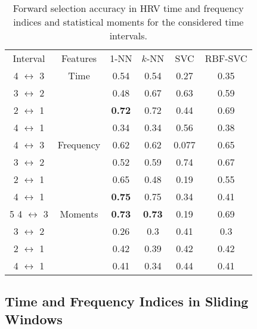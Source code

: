\begin{table}[t]
\caption{Forward selection accuracy in HRV time and frequency indices and statistical moments for the considered time intervals.}
\label{tab:time:freq:5min:moments:featsel}
\centering
\begin{tabular}{cccccc}
 Interval             &Features  & 1-NN & $k$-NN & SVC           & RBF-SVC       \\ 
 4 $\leftrightarrow$  3 & Time& 0.54  &   0.54  &   0.27   &  0.35 \\
 3 $\leftrightarrow$  2 & & 0.48  &   0.67  &   0.63   &  0.59 \\
 2 $\leftrightarrow$  1 & & \textbf{0.72}  &   0.72  &   0.44   &  0.69 \\
 4 $\leftrightarrow$  1 & & 0.34  &   0.34  &   0.56   &  0.38 \\
 4 $\leftrightarrow$  3 &Frequency &  0.62  &   0.62  &   0.077  &   0.65 \\
 3 $\leftrightarrow$  2 & &  0.52  &   0.59  &   0.74   &   0.67 \\
 2 $\leftrightarrow$  1 & &  0.65  &   0.48  &   0.19   &   0.55 \\
 4 $\leftrightarrow$  1 & &  \textbf{0.75}  &   0.75  &   0.34   &   0.41 \\
5
 4 $\leftrightarrow$  3 & Moments&\textbf{0.73}  &    \textbf{0.73}   &   0.19   &   0.69    \\
 3 $\leftrightarrow$  2 & &0.26  &     0.3   &   0.41   &    0.3    \\
 2 $\leftrightarrow$  1 & &0.42  &    0.39   &   0.42   &   0.42    \\
 4 $\leftrightarrow$  1 & &0.41  &    0.34   &   0.44   &   0.41    \\
\end{tabular}
\end{table}
  




\subsection{Time and Frequency Indices in Sliding Windows}

